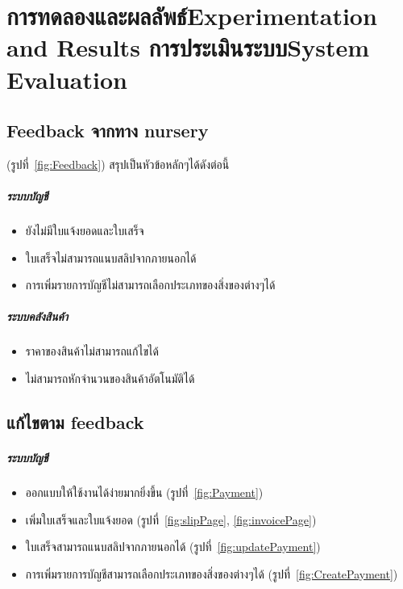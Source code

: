 \chapter{\ifproject%
\ifcpe การทดลองและผลลัพธ์\else Experimentation and Results\fi
\else%
\ifcpe การประเมินระบบ\else System Evaluation\fi
\fi}

\section{Feedback จากทาง nursery}
(รูปที่~\ref{fig:Feedback})
สรุปเป็นหัวข้อหลักๆได้ดังต่อนี้
\paragraph{ระบบบัญชี}
\begin{itemize}
    \item ยังไม่มีใบแจ้งยอดและใบเสร็จ
    \item ใบเสร็จไม่สามารถแนบสลิปจากภายนอกได้
    \item การเพิ่มรายการบัญชีไม่สามารถเลือกประเภทของสิ่งของต่างๆได้ 
\end{itemize}
\paragraph{ระบบคลังสินค้า}
\begin{itemize}
    \item ราคาของสินค้าไม่สามารถแก้ไขได้
    \item ไม่สามารถหักจำนวนของสินค้าอัตโนมัติได้
\end{itemize}

\section{แก้ไขตาม feedback}
\paragraph{ระบบบัญชี}
\begin{itemize}
    \item ออกแบบให้ใช้งานได้ง่ายมากยิ่งขึ้น (รูปที่~\ref{fig:Payment})
    \item เพิ่มใบเสร็จและใบแจ้งยอด (รูปที่~\ref{fig:slipPage}, \ref{fig:invoicePage})
    \item ใบเสร็จสามารถแนบสลิปจากภายนอกได้ (รูปที่~\ref{fig:updatePayment})
    \item การเพิ่มรายการบัญชีสามารถเลือกประเภทของสิ่งของต่างๆได้ (รูปที่~\ref{fig:CreatePayment})
\end{itemize}
